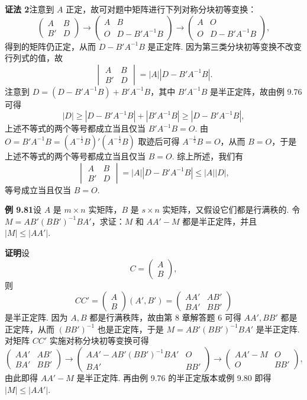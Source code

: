 \documentclass[UTF8, 12pt, fontset=fandol, oneside]{ctexart}
\begin{document}
\noindent\textbf{证法 2}\quad 注意到 $A$ 正定，故可对题中矩阵进行下列对称分块初等变换：
\[
\begin{pmatrix}
A&B\\
B'&D
\end{pmatrix}
\longrightarrow
\begin{pmatrix}
A&B\\
O&D-B'A^{-1}B
\end{pmatrix}
\longrightarrow
\begin{pmatrix}
A&O\\
O&D-B'A^{-1}B
\end{pmatrix},
\]
得到的矩阵仍正定，从而 $D-B'A^{-1}B$ 是正定阵. 因为第三类分块初等变换不改变行列式的值，故
\[
\begin{vmatrix}
A&B\\
B'&D
\end{vmatrix}
=|A||D-B'A^{-1}B|.
\]
注意到 $D=(D-B'A^{-1}B)+B'A^{-1}B$，其中 $B'A^{-1}B$ 是半正定阵，故由例 9.76 可得
\[
|D|\ge |D-B'A^{-1}B|+|B'A^{-1}B|\ge |D-B'A^{-1}B|,
\]
上述不等式的两个等号都成立当且仅当 $B'A^{-1}B=O$. 由 $O=B'A^{-1}B=(A^{-\frac12}B)'(A^{-\frac12}B)$ 取迹后可得 $A^{-\frac12}B=O$，从而 $B=O$，于是上述不等式的两个等号都成立当且仅当 $B=O$. 综上所述，我们有
\[
\begin{vmatrix}
A&B\\
B'&D
\end{vmatrix}
=|A||D-B'A^{-1}B|\le |A||D|,
\]
等号成立当且仅当 $B=O$.

\noindent\textbf{例 9.81}\quad 设 $A$ 是 $m\times n$ 实矩阵，$B$ 是 $s\times n$ 实矩阵，又假设它们都是行满秩的. 令 $M=AB'(BB')^{-1}BA'$，求证：$M$ 和 $AA'-M$ 都是半正定阵，并且 $|M|\le |AA'|$.

\noindent\textbf{证明}\quad 设
\[
C=\begin{pmatrix}A\\B\end{pmatrix},
\]
则
\[
CC'=\begin{pmatrix}A\\B\end{pmatrix}(A',B')
=\begin{pmatrix}
AA'&AB'\\
BA'&BB'
\end{pmatrix}
\]
是半正定阵. 因为 $A,B$ 都是行满秩阵，故由第 8 章解答题 6 可得 $AA',BB'$ 都是正定阵，从而 $(BB')^{-1}$ 也是正定阵，于是 $M=AB'(BB')^{-1}BA'$ 是半正定阵. 对矩阵 $CC'$ 实施对称分块初等变换可得
\[
\begin{pmatrix}
AA'&AB'\\
BA'&BB'
\end{pmatrix}
\longrightarrow
\begin{pmatrix}
AA'-AB'(BB')^{-1}BA'&O\\
BA'&BB'
\end{pmatrix}
\longrightarrow
\begin{pmatrix}
AA'-M&O\\
O&BB'
\end{pmatrix},
\]
由此即得 $AA'-M$ 是半正定阵. 再由例 9.76 的半正定版本或例 9.80 即得 $|M|\le |AA'|$.
\end{document}
